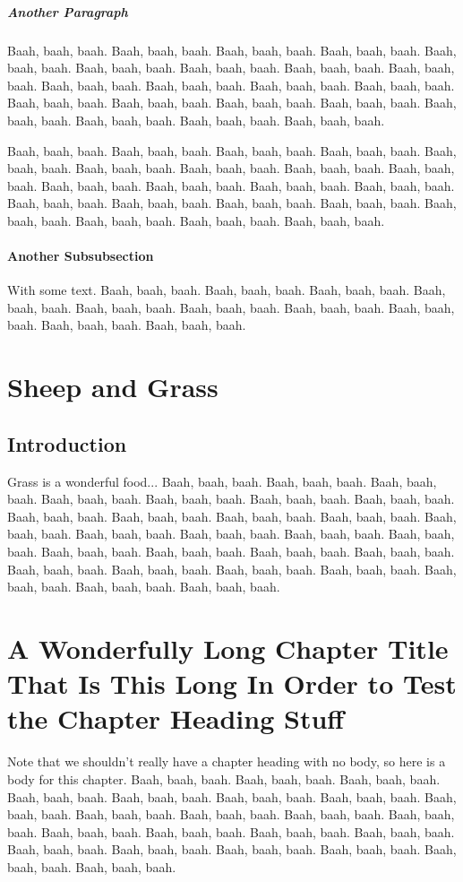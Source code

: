 \documentclass{umassthesis}          %
\begin{document}
\paragraph{Another Paragraph}
Baah, baah, baah.  Baah, baah, baah.  Baah, baah, baah.  Baah, baah,
baah.  Baah, baah, baah.  Baah, baah, baah.  Baah, baah, baah.  Baah,
baah, baah.  Baah, baah, baah.  Baah, baah, baah.  Baah, baah, baah.
Baah, baah, baah.  Baah, baah, baah.  Baah, baah, baah.  Baah, baah,
baah.  Baah, baah, baah.  Baah, baah, baah.  Baah, baah, baah.  Baah,
baah, baah.  Baah, baah, baah.  Baah, baah, baah.

Baah, baah, baah.  Baah, baah, baah.  Baah, baah, baah.  Baah, baah,
baah.  Baah, baah, baah.  Baah, baah, baah.  Baah, baah, baah.  Baah,
baah, baah.  Baah, baah, baah.  Baah, baah, baah.  Baah, baah, baah.
Baah, baah, baah.  Baah, baah, baah.  Baah, baah, baah.  Baah, baah,
baah.  Baah, baah, baah.  Baah, baah, baah.  Baah, baah, baah.  Baah,
baah, baah.  Baah, baah, baah.  Baah, baah, baah.
\subsubsection{Another Subsubsection}
With some text.  Baah, baah, baah.  Baah, baah, baah.  Baah, baah,
baah.  Baah, baah, baah.  Baah, baah, baah.  Baah, baah, baah.  Baah,
baah, baah.  Baah, baah, baah.  Baah, baah, baah.  Baah, baah, baah. 

\chapter{Sheep and Grass}

\section{Introduction}

Grass is a wonderful food...  Baah, baah, baah.  Baah, baah, baah.
Baah, baah, baah.  Baah, baah, baah.  Baah, baah, baah.  Baah, baah,
baah.  Baah, baah, baah.  Baah, baah, baah.  Baah, baah, baah.  Baah,
baah, baah.  Baah, baah, baah.  Baah, baah, baah.  Baah, baah, baah.
Baah, baah, baah.  Baah, baah, baah.  Baah, baah, baah.  Baah, baah,
baah.  Baah, baah, baah.  Baah, baah, baah.  Baah, baah, baah.  Baah,
baah, baah.  Baah, baah, baah.  Baah, baah, baah.  Baah, baah, baah.
Baah, baah, baah.  Baah, baah, baah.  Baah, baah, baah. 

\chapter{A Wonderfully Long Chapter Title That Is This Long In Order
  to Test the Chapter Heading Stuff}
Note that we shouldn't really have a chapter heading with no body, so
here is a body for this chapter.  Baah, baah, baah.  Baah, baah, baah.
Baah, baah, baah.  Baah, baah, baah.  Baah, baah, baah.  Baah, baah,
baah.  Baah, baah, baah.  Baah, baah, baah.  Baah, baah, baah.  Baah,
baah, baah.  Baah, baah, baah.  Baah, baah, baah.  Baah, baah, baah.
Baah, baah, baah.  Baah, baah, baah.  Baah, baah, baah.  Baah, baah,
baah.  Baah, baah, baah.  Baah, baah, baah.  Baah, baah, baah.  Baah,
baah, baah.  Baah, baah, baah. 
\end{document}
